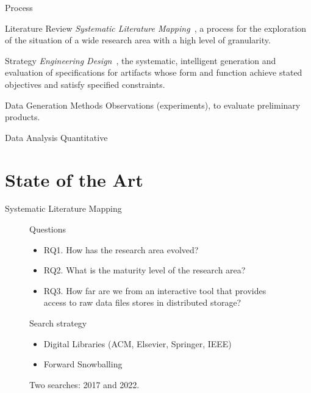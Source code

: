 \documentclass[10pt]{beamer}
\begin{document}
\begin{frame}{Process}

\begin{alertblock}{Literature Review}
    \emph{Systematic Literature Mapping}~\cite{Petersen2007}, a process for the exploration of
    the situation of a wide research area with a high level of granularity.
\end{alertblock}

\begin{alertblock}{Strategy}
    \emph{Engineering Design}~\cite{Dym2012}, the systematic, intelligent generation and evaluation
    of specifications for artifacts whose form and function achieve stated objectives and satisfy specified
    constraints.
\end{alertblock}

\begin{alertblock}{Data Generation Methods}
Observations (experiments), to evaluate preliminary products.
\end{alertblock}

\begin{alertblock}{Data Analysis}
    Quantitative
\end{alertblock}

\end{frame}

\section{State of the Art}

\begin{frame}{Systematic Literature Mapping}
\begin{figure}
    \begin{alertblock}{Questions}
        \begin{itemize}
            \item RQ1. How has the research area evolved?
            \item RQ2. What is the maturity level of the research area?
            \item RQ3. How far are we from an interactive tool that provides access to raw data files stores in distributed storage?
        \end{itemize}
    \end{alertblock}
    \begin{block}{Search strategy}
        \begin{itemize}
            \item Digital Libraries (ACM, Elsevier, Springer, IEEE)
            \item Forward Snowballing
        \end{itemize}
        Two searches: 2017 and 2022.
    \end{block}
\end{figure}
\end{frame}
\end{document}
